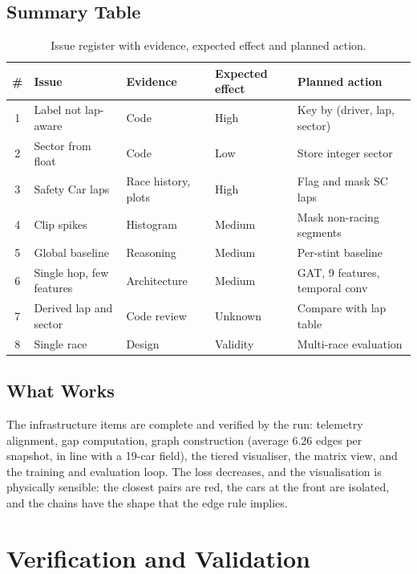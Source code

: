\documentclass[11pt,a4paper]{article}
\begin{document}
\subsection{Summary Table}
\begin{table}[H]
\centering
\caption{Issue register with evidence, expected effect and planned action.}
\label{tab:issues}
\small
\begin{tabularx}{\linewidth}{@{}clllX@{}}
\toprule
\textbf{\#} & \textbf{Issue} & \textbf{Evidence} & \textbf{Expected effect} & \textbf{Planned action} \\
\midrule
1 & Label not lap-aware & Code & High & Key by (driver, lap, sector) \\
2 & Sector from float & Code & Low & Store integer sector \\
3 & Safety Car laps & Race history, plots & High & Flag and mask SC laps \\
4 & Clip spikes & Histogram & Medium & Mask non-racing segments \\
5 & Global baseline & Reasoning & Medium & Per-stint baseline \\
6 & Single hop, few features & Architecture & Medium & GAT, 9 features, temporal conv \\
7 & Derived lap and sector & Code review & Unknown & Compare with lap table \\
8 & Single race & Design & Validity & Multi-race evaluation \\
\bottomrule
\end{tabularx}
\end{table}

\subsection{What Works}
The infrastructure items are complete and verified by the run: telemetry
alignment, gap computation, graph construction (average 6.26 edges per
snapshot, in line with a 19-car field), the tiered visualiser, the matrix view,
and the training and evaluation loop. The loss decreases, and the
visualisation is physically sensible: the closest pairs are red, the
cars at the front are isolated, and the chains have the shape that the edge
rule implies.

\section{Verification and Validation}
\label{sec:vv}
\end{document}
